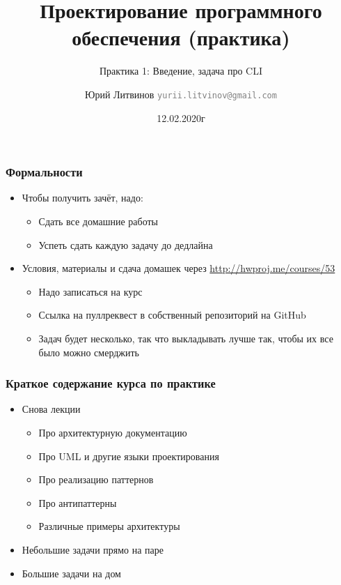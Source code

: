\documentclass[xetex,mathserif,serif]{beamer}
\title{Проектирование программного обеспечения (практика)}
\subtitle{Практика 1: Введение, задача про CLI}
\author[Юрий Литвинов]{Юрий Литвинов \newline \textcolor{gray}{\small\texttt{yurii.litvinov@gmail.com}}}
\date{12.02.2020г}
\begin{document}
	
	\frame{\titlepage}
	
	\begin{frame}
		\frametitle{Формальности}
		\begin{itemize}
			\item Чтобы получить зачёт, надо:
			\begin{itemize}
				\item Сдать все домашние работы
				\item Успеть сдать каждую задачу до дедлайна
			\end{itemize}
			\item Условия, материалы и сдача домашек через \url{http://hwproj.me/courses/53}
			\begin{itemize}
				\item Надо записаться на курс
			\end{itemize}
			\begin{itemize}
				\item Ссылка на пуллреквест в собственный репозиторий на GitHub
				\item Задач будет несколько, так что выкладывать лучше так, чтобы их все было можно смерджить
			\end{itemize}
		\end{itemize}
	\end{frame}

	\begin{frame}
		\frametitle{Краткое содержание курса по практике}
		\begin{itemize}
			\item Снова лекции
			\begin{itemize}
				\item Про архитектурную документацию
				\item Про UML и другие языки проектирования
				\item Про реализацию паттернов
				\item Про антипаттерны
				\item Различные примеры архитектуры
			\end{itemize}
			\item Небольшие задачи прямо на паре
			\item Большие задачи на дом
		\end{itemize}
	\end{frame}
	
\end{document}
